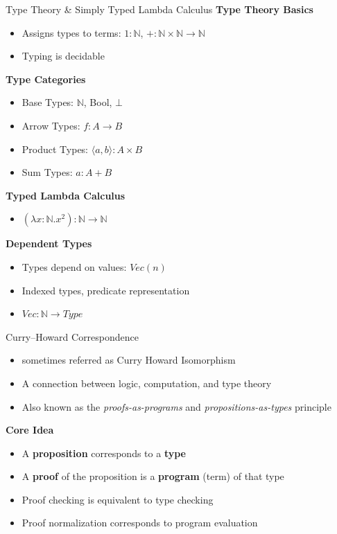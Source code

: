 \documentclass[aspectratio=169, 12pt]{beamer}
\begin{document}
\begin{frame}{Type Theory \& Simply Typed Lambda Calculus}
\textbf{Type Theory Basics}
\begin{itemize}
  \item Assigns types to terms: $1 : \mathbb{N}$, $+ : \mathbb{N} \times \mathbb{N} \to \mathbb{N}$
  \item Typing is decidable
\end{itemize}

\textbf{Type Categories}
\begin{itemize}
  \item Base Types: $\mathbb{N}$, Bool, $\bot$
  \item Arrow Types: $f : A \to B$
  \item Product Types: $\langle a, b \rangle : A \times B$
  \item Sum Types: $a : A + B$
\end{itemize}
\end{frame}
\begin{frame}
   \textbf{Typed Lambda Calculus}
\begin{itemize}
  \item $(\lambda x : \mathbb{N}.x^2) : \mathbb{N} \to \mathbb{N}$
\end{itemize}
 \textbf{Dependent Types}
\begin{itemize}
  \item Types depend on values: $Vec(n)$
  \item Indexed types, predicate representation
  \item $Vec : \mathbb{N} \to Type$
\end{itemize}

\end{frame}


\begin{frame}{ Curry–Howard Correspondence}
    \begin{itemize}
  \item sometimes referred as Curry Howard Isomorphism
  \item A connection between logic, computation, and type theory
  \item Also known as the \textit{proofs-as-programs} and \textit{propositions-as-types} principle
\end{itemize}

\textbf{Core Idea}
\begin{itemize}
  \item A \textbf{proposition} corresponds to a \textbf{type}
  \item A \textbf{proof} of the proposition is a \textbf{program} (term) of that type
  \item Proof checking is equivalent to type checking
  \item Proof normalization corresponds to program evaluation
\end{itemize}
\end{frame}
\end{document}
